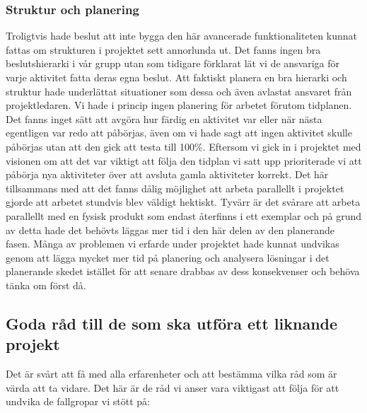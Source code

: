 \documentclass{article}
\begin{document}
\subsubsection{Struktur och planering}
Troligtvis hade beslut att inte bygga den här avancerade funktionaliteten kunnat fattas om strukturen i projektet sett annorlunda ut. Det fanns ingen bra beslutshierarki i vår grupp utan som tidigare förklarat lät vi de ansvariga för varje aktivitet fatta deras egna beslut. Att faktiskt planera en bra hierarki och struktur hade underlättat situationer som dessa och även avlastat ansvaret från projektledaren.
\newline\newline
Vi hade i princip ingen planering för arbetet förutom tidplanen. Det fanns inget sätt att avgöra hur färdig en aktivitet var eller när nästa egentligen var redo att påbörjas, även om vi hade sagt att ingen aktivitet skulle påbörjas utan att den gick att testa till 100\%. Eftersom vi gick in i projektet med visionen om att det var viktigt att följa den tidplan vi satt upp prioriterade vi att påbörja nya aktiviteter över att avsluta gamla aktiviteter korrekt. Det här tillsammans med att det fanns dålig möjlighet att arbeta parallellt i projektet gjorde att arbetet stundvis blev väldigt hektiskt. Tyvärr är det svårare att arbeta parallellt med en fysisk produkt som endast återfinns i ett exemplar och på grund av detta hade det behövts läggas mer tid i den här delen av den planerande fasen. Många av problemen vi erfarde under projektet hade kunnat undvikas genom att lägga mycket mer tid på planering och analysera lösningar i det planerande skedet istället för att senare drabbas av dess konsekvenser och behöva tänka om först då.

\subsection{Goda råd till de som ska utföra ett liknande projekt}
Det är svårt att få med alla erfarenheter och att bestämma vilka råd som är värda att ta vidare. Det här är de råd vi anser vara viktigast att följa för att undvika de fallgropar vi stött på:
\end{document}
